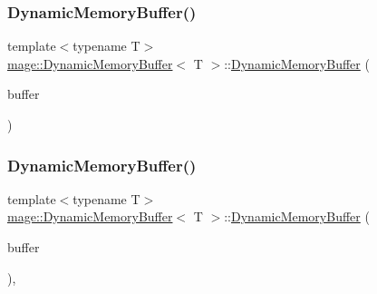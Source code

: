 \mbox{\label{classmage_1_1_dynamic_memory_buffer_adb6ade5258c5d27e553915b2e89e26be}} 
\subsubsection{\texorpdfstring{Dynamic\+Memory\+Buffer()}{DynamicMemoryBuffer()}\hspace{0.1cm}{\footnotesize\ttfamily [2/3]}}
{\footnotesize\ttfamily template$<$typename T$>$ \\
\mbox{\hyperlink{classmage_1_1_dynamic_memory_buffer}{mage\+::\+Dynamic\+Memory\+Buffer}}$<$ T $>$\+::\mbox{\hyperlink{classmage_1_1_dynamic_memory_buffer}{Dynamic\+Memory\+Buffer}} (\begin{DoxyParamCaption}\item[{const \mbox{\hyperlink{classmage_1_1_dynamic_memory_buffer}{Dynamic\+Memory\+Buffer}}$<$ T $>$ \&}]{buffer }\end{DoxyParamCaption})\hspace{0.3cm}{\ttfamily [delete]}}

\mbox{\label{classmage_1_1_dynamic_memory_buffer_a2492c04f3fe2562c20ac285723ad0512}} 
\subsubsection{\texorpdfstring{Dynamic\+Memory\+Buffer()}{DynamicMemoryBuffer()}\hspace{0.1cm}{\footnotesize\ttfamily [3/3]}}
{\footnotesize\ttfamily template$<$typename T$>$ \\
\mbox{\hyperlink{classmage_1_1_dynamic_memory_buffer}{mage\+::\+Dynamic\+Memory\+Buffer}}$<$ T $>$\+::\mbox{\hyperlink{classmage_1_1_dynamic_memory_buffer}{Dynamic\+Memory\+Buffer}} (\begin{DoxyParamCaption}\item[{\mbox{\hyperlink{classmage_1_1_dynamic_memory_buffer}{Dynamic\+Memory\+Buffer}}$<$ T $>$ \&\&}]{buffer }\end{DoxyParamCaption})\hspace{0.3cm}{\ttfamily [default]}, {\ttfamily [noexcept]}}

